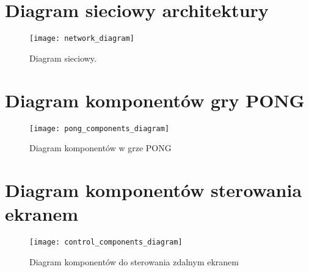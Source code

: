 \begin{appendices}


\newpage
\section{Diagram sieciowy architektury}
\label{app:network_diagram_app}
\begin{figure}[H]
\begin{center}
    \texttt{[image: network\_diagram]}
\end{center}
\caption{Diagram sieciowy.}
\label{fig:network_diagram1}
\end{figure}



\newpage
\section{Diagram komponentów gry PONG}
\label{app:netwo}
\begin{figure}[H]
\begin{center}
    \texttt{[image: pong\_components\_diagram]}
\end{center}
\caption{Diagram komponentów w grze PONG}
\label{fig:network_diagram}
\end{figure}



\newpage
\section{Diagram komponentów sterowania ekranem}
\label{app:netwo}
\begin{figure}[H]
\begin{center}
    \texttt{[image: control\_components\_diagram]}
\end{center}
\caption{Diagram komponentów do sterowania zdalnym ekranem}
\label{fig:network_diagram}
\end{figure}




\newpage

\end{appendices}
